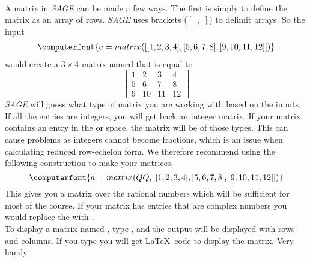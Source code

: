 \contributedby{\stevecanfield}\\
A matrix in {\sl SAGE} can be made a few ways. The first is simply to define the matrix as an array of rows. {\sl SAGE} uses brackets ($\left\lbrack\right.$~,~$\left.\right\rbrack$) to delimit arrays.  So the input
\begin{align*}
\computerfont{a = matrix( [[1,2,3,4], [5,6,7,8],[9,10,11,12]] )}
\end{align*}
%
would create a $3\times 4$ matrix named  that is equal to
%
\begin{equation*}
%
\begin{bmatrix}
1&2&3&4\\
5&6&7&8\\
9&10&11&12
\end{bmatrix}
%
\end{equation*}
%
{\sl SAGE} will guess what type of matrix you are working with based on the inputs. If all the entries are integers, you will get back an integer matrix. If your matrix contains an entry in the \real{} or \complexes space, the matrix will be of those types. This can cause problems as integers cannot become fractions, which is an issue when calculating reduced row-echelon form. We therefore recommend using the following construction to make your matrices,
%
\begin{equation*}
\computerfont{a = matrix( QQ, [[1,2,3,4], [5,6,7,8],[9,10,11,12]] )}
\end{equation*}
%
This gives you a matrix over the rational numbers which will be sufficient for most of the course. If your matrix has entries that are complex numbers you would replace the  with .\\
%
To display a matrix named , type , and the output will be displayed with rows and columns. If you type  you will get \LaTeX\ code to display the matrix.  Very handy.